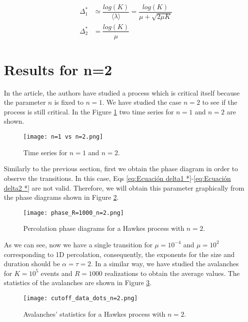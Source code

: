 \begin{align}
    \Delta_1^* &\simeq \dfrac{log(K)}{\langle \lambda \rangle}= \dfrac{log(K)}{\mu+\sqrt{2\mu K}} \label{eq:Ecuación delta1 *} \\
    \Delta_2^* &= \dfrac{log(K)}{\mu}\label{eq:Ecuación delta2 *}
\end{align}

\section{Results for n=2}

In the article, the authors have studied a process which is critical itself because the parameter $n$ is fixed to $n=1$. We have studied the case $n=2$ to see if the process is still critical. 
In the Figure \ref{f:n=1 vs n=2} two time series for $n=1$ and $n=2$ are shown. 

\begin{figure}[H]
    \centering
    \texttt{[image: n=1 vs n=2.png]}
    \caption{Time series for $n=1$ and $n=2$.}
    \label{f:n=1 vs n=2}
\end{figure}

Similarly to the previous section, first we obtain the phase diagram in order to observe the transitions. In this case, Eqs \ref{eq:Ecuación delta1 *}-\ref{eq:Ecuación delta2 *} are not valid.
Therefore, we will obtain this parameter graphically from the phase diagrams shown in Figure \ref{f:phase_diagram_n=2}.
\begin{figure}[H]
    \centering
    \texttt{[image: phase\_R=1000\_n=2.png]}
    \caption{Percolation phase diagrams for a Hawkes process with $n=2$.}
    \label{f:phase_diagram_n=2}
\end{figure}

As we can see, now we have a single transition for $\mu=10^{-4}$ and $\mu=10^2$ corresponding to 1D percolation, consequently, the exponents for the size and duration 
should be $\alpha=\tau=2$. In a similar way, we have studied the avalanches for $K=10^5$ events and $R=1000$ realizations to obtain the average values. The statistics of the avalanches 
are shown in Figure \ref{f:avalanches_n=2}.

\begin{figure}[H]
    \centering
    \texttt{[image: cutoff\_data\_dots\_n=2.png]}
    \caption{Avalanches' statistics for a Hawkes process with $n=2$.}
    \label{f:avalanches_n=2}
\end{figure}